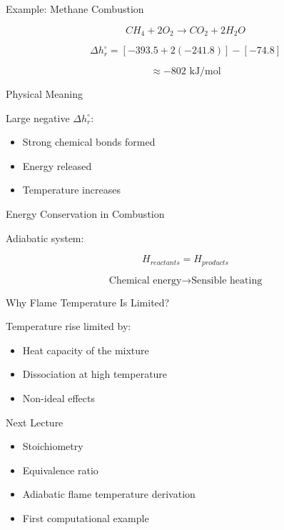 \documentclass[aspectratio=169]{beamer}
\begin{document}
\begin{frame}{Example: Methane Combustion}

\[
CH_4 + 2O_2 \rightarrow CO_2 + 2H_2O
\]

\pause

\[
\Delta h_r^\circ =
[-393.5 + 2(-241.8)]
-
[-74.8]
\]

\pause

\[
\approx -802 \text{ kJ/mol}
\]

\end{frame}

\begin{frame}{Physical Meaning}

Large negative $\Delta h_r^\circ$:

\begin{itemize}
  \item Strong chemical bonds formed
  \item Energy released
  \item Temperature increases
\end{itemize}

\end{frame}

\begin{frame}{Energy Conservation in Combustion}

Adiabatic system:

\[
H_{reactants} = H_{products}
\]

\pause

\[
\text{Chemical energy} \rightarrow \text{Sensible heating}
\]

\end{frame}

\begin{frame}{Why Flame Temperature Is Limited?}

Temperature rise limited by:

\begin{itemize}
  \item Heat capacity of the mixture
  \item Dissociation at high temperature
  \item Non-ideal effects
\end{itemize}

\end{frame}

\begin{frame}{Next Lecture}

\begin{itemize}
  \item Stoichiometry
  \item Equivalence ratio
  \item Adiabatic flame temperature derivation
  \item First computational example
\end{itemize}

\end{frame}
\end{document}

